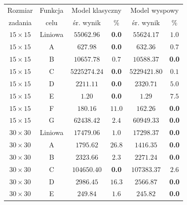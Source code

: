 \newpage

\begin{table}[H]
    \begin{center}
        \begin{tabular}{c|c||c|c||c|c}
            Rozmiar         & Funkcja    & \multicolumn{2}{c||}{Model klasyczny}  & \multicolumn{2}{c}{Model wyspowy} \\ \cline{3-4} \cline{5-6}
            zadania         & celu       & śr. wynik & \%                        & śr. wynik & \%                 \\
            \hline
            \hline
            $15 \times 15$ & Liniowa     & $55062.96$ & \textbf{0.0}             & $55624.17$ & $1.0$ \\
            $15 \times 15$ & A           & $627.98$ & \textbf{0.0}               & $632.36$ & $0.7$ \\
            $15 \times 15$ & B           & $10657.78$ & $0.7$                    & $10588.37$ & \textbf{0.0} \\
            $15 \times 15$ & C           & $5225274.24$ & \textbf{0.0}           & $5229421.80$ & $0.1$ \\
            $15 \times 15$ & D           & $2211.11$ & \textbf{0.0}              & $2320.71$ & $5.0$ \\
            $15 \times 15$ & E           & $1.20$ & \textbf{0.0}                 & $1.29$ & $7.5$ \\
            $15 \times 15$ & F           & $180.16$ & $11.0$                     & $162.26$ & \textbf{0.0} \\
            $15 \times 15$ & G           & $62438.42$ & $2.4$                    & $60949.33$ & \textbf{0.0} \\
            \hline
            $30 \times 30$ & Liniowa     & $17479.06$ & $1.0$                    & $17298.37$ & \textbf{0.0} \\
            $30 \times 30$ & A           & $1795.62$ & $26.8$                    & $1416.35$ & \textbf{0.0} \\
            $30 \times 30$ & B           & $2323.66$ & $2.3$                     & $2271.24$ & \textbf{0.0} \\
            $30 \times 30$ & C           & $104650.40$ & \textbf{0.0}            & $107383.37$ & $2.6$ \\
            $30 \times 30$ & D           & $2986.45$ & $16.3$                    & $2566.87$ & \textbf{0.0} \\
            $30 \times 30$ & E           & $249.84$ & $1.6$                      & $245.82$ & \textbf{0.0} \\

\end{tabular}
\end{center}
\end{table}
